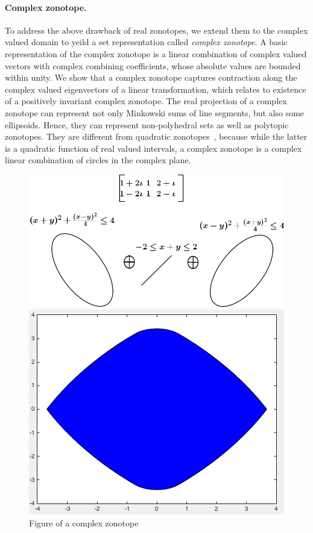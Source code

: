 \documentclass[11pt,a4paper,twoside,openright]{article}
\begin{document}
\paragraph{Complex zonotope.}  To address the above drawback of real
zonotopes, we extend them to the complex valued domain to yeild a set
representation called {\it complex zonotope}.  A basic representation
of the complex zonotope is a linear combination of complex valued
vectors with complex combining coefficients, whose absolute values are
bounded within unity.  We show that a complex zonotope captures
contraction along the complex valued eigenvectors of a linear
transformation, which relates to existence of a positively invariant
complex zonotope.  The real projection of a complex zonotope can
represent not only Minkowski sums of line segments, but also some
ellipsoids.  Hence, they can represent non-polyhedral sets as well as
polytopic zonotopes.  They are different from quadratic
zonotopes~\cite{DBLP:conf/aplas/AdjeGW15xs}, because while the latter is
a quadratic function of real valued intervals, a complex zonotope is a
complex linear combination of circles in the complex plane.
%
\begin{figure}
  \begin{minipage}{0.5\textwidth}
    \includegraphics[scale=0.6]{figures/complex-zonotope.png}
  \end{minipage}
  \hspace{5em}
  \begin{minipage}{0.4\textwidth}
    \includegraphics[scale=0.3]{figures/CZhull.png}
  \end{minipage}
  \caption{Figure of a complex zonotope}
\end{figure}
%
\end{document}
